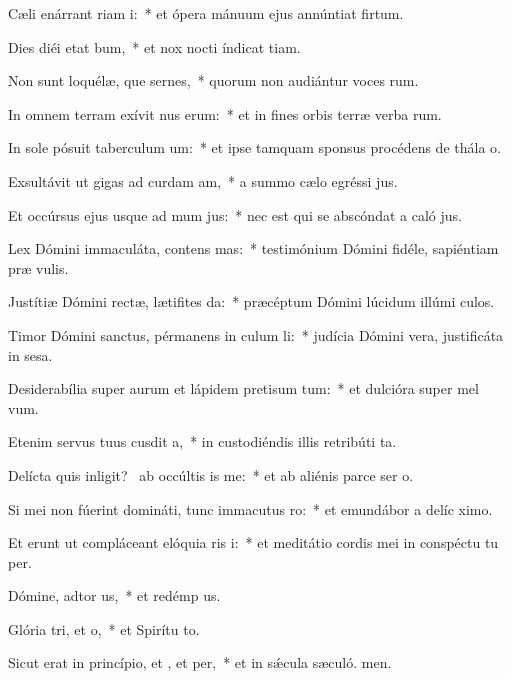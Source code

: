 \item Cæli enárrant riam i:~* et ópera mánuum ejus annúntiat firtum.
\item Dies diéi etat bum,~* et nox nocti índicat tiam.
\item Non sunt loquélæ, que sernes,~* quorum non audiántur voces rum.
\item In omnem terram exívit nus erum:~* et in fines orbis terræ verba rum.
\item In sole pósuit taberculum um:~* et ipse tamquam sponsus procédens de thála o.
\item Exsultávit ut gigas ad curdam am,~* a summo cælo egréssi jus.
\item Et occúrsus ejus usque ad mum jus:~* nec est qui se abscóndat a caló jus.
\item Lex Dómini immaculáta, contens mas:~* testimónium Dómini fidéle, sapiéntiam præ vulis.
\item Justítiæ Dómini rectæ, lætifites da:~* præcéptum Dómini lúcidum illúmi culos.
\item Timor Dómini sanctus, pérmanens in culum li:~* judícia Dómini vera, justificáta in sesa.
\item Desiderabília super aurum et lápidem pretisum tum:~* et dulcióra super mel  vum.
\item Etenim servus tuus cusdit a,~* in custodiéndis illis retribúti ta.
\item Delícta quis inligit?~\pscross{} ab occúltis is  me:~* et ab aliénis parce ser o.
\item Si mei non fúerint domináti, tunc immacutus ro:~* et emundábor a delíc ximo.
\item Et erunt ut compláceant elóquia ris i:~* et meditátio cordis mei in conspéctu tu per.
\item Dómine, adtor us,~* et redémp us.
\item Glória tri, et o,~* et Spirítu to.
\item Sicut erat in princípio, et , et per,~* et in sǽcula sæculó. men.
